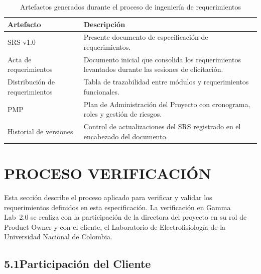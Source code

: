 \documentclass[12pt, letterpaper]{article}
\renewcommand{\arraystretch}{1.35}
\begin{document}
\begin{table}[H]
\centering
\renewcommand{\arraystretch}{1.4}

\begin{tabularx}{\textwidth}{
|>{\raggedright\arraybackslash}p{4cm}|
>{\raggedright\arraybackslash}X|
}

\hline

\rowcolor{headergray}

\textbf{Artefacto} &
\textbf{Descripción}
\\ \hline

\rowcolor{lightgray2}
SRS v1.0 &
Presente documento de especificación de requerimientos.
\\ \hline

Acta de requerimientos &
Documento inicial que consolida los requerimientos levantados
durante las sesiones de elicitación.
\\ \hline

\rowcolor{lightgray2}
Distribución de requerimientos &
Tabla de trazabilidad entre módulos y requerimientos
funcionales.
\\ \hline

PMP &
Plan de Administración del Proyecto con cronograma,
roles y gestión de riesgos.
\\ \hline

\rowcolor{lightgray2}
Historial de versiones &
Control de actualizaciones del SRS registrado
en el encabezado del documento.
\\ \hline

\end{tabularx}

\caption{Artefactos generados durante el proceso de ingeniería de requerimientos}
\label{tab:artefactos}

\end{table}
\newpage
\section{PROCESO VERIFICACIÓN}

Esta sección describe el proceso aplicado para verificar y validar los requerimientos
definidos en esta especificación. La verificación en Gamma Lab~2.0 se realiza con la
participación de la directora del proyecto en su rol de Product Owner y con el cliente,
el Laboratorio de Electrofisiología de la Universidad Nacional de Colombia.

\subsection*{5.1\quad Participación del Cliente}
\end{document}
